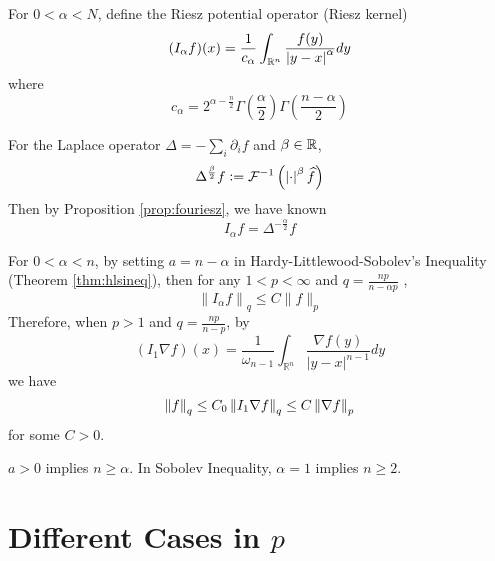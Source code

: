 \noindent For $0 < \alpha < N$, define the Riesz potential operator (Riesz kernel)
\begin{equation*}
	(I_\alpha f)(x) = \frac{1}{c_\alpha}\int_{\mathbb{R}^n}\frac{f(y)}{\left\lvert y-x\right\lvert^\alpha}dy
\end{equation*}
where
\begin{equation*}
	c_\alpha = 2^{\alpha-\frac{n}{2}} \Gamma(\frac{\alpha}{2})\Gamma(\frac{n-\alpha}{2})
\end{equation*}
\begin{rmk}
	For the Laplace operator $\Delta = -\sum_i \partial_i f$ and $\beta \in \mathbb{R}$,
	\begin{equation*}
		\Delta^{\frac{\beta}{2}} f \vcentcolon= \mathcal{F}^{-1}\left(\left\lvert\cdot\right\lvert^\beta\widehat{f}\right)
	\end{equation*}
	Then by Proposition \ref{prop:fouriesz}, we have known
	\begin{equation*}
		I_\alpha f = \Delta^{-\frac{\alpha}{2}} f
	\end{equation*}
\end{rmk}
For $0 < \alpha < n$, by setting $a = n-\alpha$ in Hardy-Littlewood-Sobolev's Inequality (Theorem \ref{thm:hlsineq}), then for any $1 < p < \infty$ and $q = \frac{np}{n-\alpha p}$ ,
\begin{equation*}
	\left\|I_\alpha f\right\|_q \leq C\|f\|_p
\end{equation*}
Therefore, when $p > 1$ and $q = \frac{np}{n-p}$, by
\begin{equation*}
	(I_1\nabla f)(x) =  \frac{1}{\omega_{n-1}} \int_{\mathbb{R}^n} \frac{\nabla f(y)}{|y-x|^{n-1}} d y
\end{equation*}
we have
\begin{equation*}
	\left\lVert f\right\lVert_q \leq C_0\left\lVert I_1\nabla f\right\lVert_q \leq C\left\lVert\nabla f\right\lVert_p
\end{equation*}
for some $C > 0$.
\begin{rmk}
	$a > 0$ implies $n \geq \alpha$. In Sobolev Inequality, $\alpha = 1$ implies $n \geq 2$.
\end{rmk}

\section{Different Cases in \texorpdfstring{$p$}{p}}

